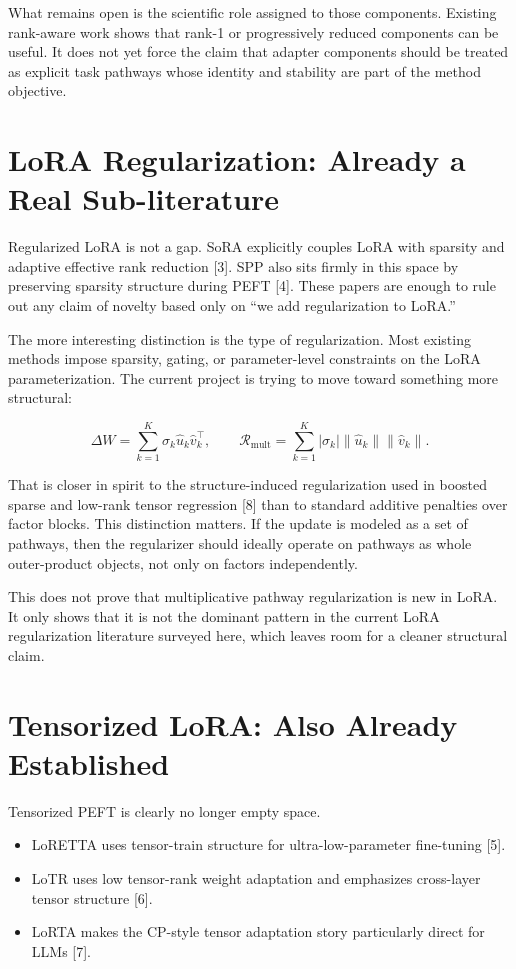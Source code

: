 \documentclass[11pt]{article}
\begin{document}
What remains open is the scientific role assigned to those components. Existing rank-aware work shows that rank-1 or progressively reduced components can be useful. It does not yet force the claim that adapter components should be treated as explicit task pathways whose identity and stability are part of the method objective.

\section{LoRA Regularization: Already a Real Sub-literature}

Regularized LoRA is not a gap. SoRA explicitly couples LoRA with sparsity and adaptive effective rank reduction [3]. SPP also sits firmly in this space by preserving sparsity structure during PEFT [4]. These papers are enough to rule out any claim of novelty based only on ``we add regularization to LoRA.''

The more interesting distinction is the type of regularization. Most existing methods impose sparsity, gating, or parameter-level constraints on the LoRA parameterization. The current project is trying to move toward something more structural:

\[
\Delta W = \sum_{k=1}^{K} \sigma_k \hat{u}_k \hat{v}_k^\top,
\qquad
\mathcal{R}_{\mathrm{mult}} = \sum_{k=1}^{K} |\sigma_k| \lVert \hat{u}_k \rVert \lVert \hat{v}_k \rVert.
\]

That is closer in spirit to the structure-induced regularization used in boosted sparse and low-rank tensor regression [8] than to standard additive penalties over factor blocks. This distinction matters. If the update is modeled as a set of pathways, then the regularizer should ideally operate on pathways as whole outer-product objects, not only on factors independently.

This does not prove that multiplicative pathway regularization is new in LoRA. It only shows that it is not the dominant pattern in the current LoRA regularization literature surveyed here, which leaves room for a cleaner structural claim.

\section{Tensorized LoRA: Also Already Established}

Tensorized PEFT is clearly no longer empty space.

\begin{itemize}
\item LoRETTA uses tensor-train structure for ultra-low-parameter fine-tuning [5].
\item LoTR uses low tensor-rank weight adaptation and emphasizes cross-layer tensor structure [6].
\item LoRTA makes the CP-style tensor adaptation story particularly direct for LLMs [7].
\end{itemize}
\end{document}

